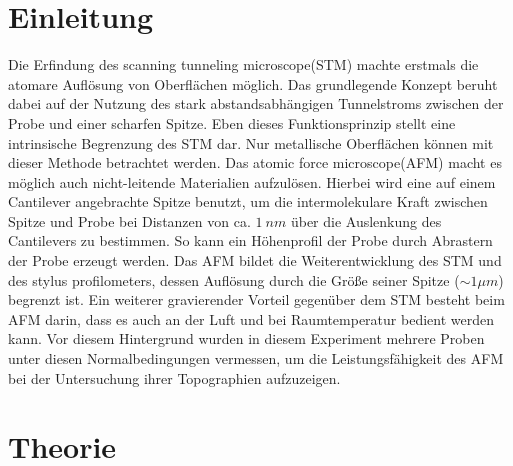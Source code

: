 \section*{Einleitung}
Die Erfindung des \glqq scanning tunneling microscope\grqq (STM) machte erstmals die atomare Auflösung von Oberflächen möglich.
Das grundlegende Konzept beruht dabei auf der Nutzung des stark abstandsabhängigen Tunnelstroms zwischen der Probe und einer scharfen Spitze.
Eben dieses Funktionsprinzip stellt eine intrinsische Begrenzung des STM dar.
Nur metallische Oberflächen können mit dieser Methode betrachtet werden.
Das \glqq atomic force microscope\grqq (AFM) macht es möglich auch nicht-leitende Materialien aufzulösen.
Hierbei wird eine auf einem Cantilever angebrachte Spitze benutzt, um die intermolekulare Kraft zwischen Spitze und Probe bei Distanzen von ca. $\SI{1}{nm}$ über die Auslenkung des Cantilevers zu bestimmen.
So kann ein Höhenprofil der Probe durch Abrastern der Probe erzeugt werden.
Das AFM bildet die Weiterentwicklung des STM und des \glqq stylus profilometers\grqq, dessen Auflösung durch die Größe seiner Spitze ($\sim 1\mu m$) begrenzt ist.
Ein weiterer gravierender Vorteil gegenüber dem STM besteht beim AFM darin, dass es auch an der Luft und bei Raumtemperatur bedient werden kann.
Vor diesem Hintergrund wurden in diesem Experiment mehrere Proben unter diesen Normalbedingungen vermessen, um die Leistungsfähigkeit des AFM bei der Untersuchung ihrer Topographien aufzuzeigen.

\section{Theorie}
